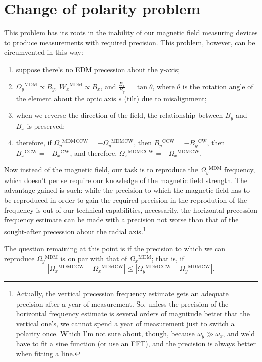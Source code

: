 \documentclass{article}
\newcommand{\W}{\Omega}
\newcommand{\w}{\omega}
\newcommand{\MDM}{{}^\mathrm{MDM}}
\newcommand{\CW}{{}^\mathrm{CW}}
\newcommand{\CCW}{{}^\mathrm{CCW}}
\begin{document}
\section{Change of polarity problem}
This problem has its roots in the inability of our magnetic field measuring devices to produce measurements with required precision. This problem, however, can be circumvented in this way:
\begin{enumerate}
\item suppose there's no EDM precession about the y-axis;
\item $\W_y\MDM\propto B_y$, $W_x\MDM\propto B_x$, and $\frac{B_x}{B_y} = \tan\theta$, where $\theta$ is the rotation angle of the element about the optic axis $s$ (tilt) due to misalignment;
\item when we reverse the direction of the field, the relationship between $B_y$ and $B_x$ is preserved;
\item therefore, if $\W_y\MDM\CCW = -\W_y\MDM\CW$, then $B_y\CCW = -B_y\CW$, then $B_x\CCW = -B_x\CW$, and therefore, $\W_x\MDM\CCW = -\W_x\MDM\CW$.
\end{enumerate}

Now instead of the magnetic field, our task is to reproduce the $\W_y\MDM$ frequency, which doesn't per se require our knowledge of the magnetic field strength. The advantage gained is such: while the precision to which the magnetic field has to be reproduced in order to gain the required precision in the reprodution of the frequency is out of our technical capabilities, necessarily, the horizontal precession frequency estimate can be made with a precision not worse than that of the sought-after precession about the radial axis.\footnote{Actually, the vertical precession frequency estimate gets an adequate precision after a year of measurement. So, unless the precision of the horizontal frequency estimate is several orders of magnitude better that the vertical one's, we cannot spend a year of measurement just to switch a polarity once. Which I'm not sure about, though, because $\w_y \gg \w_x$, and we'd have to fit a sine function (or use an FFT), and the precision is always better when fitting a line.}

The question remaining at this point is if the precision to which we can reproduce $\W_y\MDM$ is on par with that of $\W_x\MDM$; that is, if
\begin{equation}\label{eq:calibration_condition}
  |\W_x\MDM\CCW - \W_x\MDM\CW| \leq |\W_y\MDM\CCW - \W_y\MDM\CW|.
\end{equation}
\end{document}
